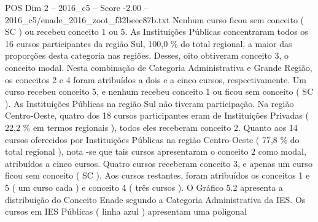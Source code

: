 \begin{textsample}{POS Dim 2 – 2016\_c5 – Score -2.00 – 2016\_c5/enade\_2016\_zoot\_f32beec87b.txt}
Nenhum curso ficou sem conceito ( SC ) ou recebeu conceito 1 ou 5.
As Instituições Públicas concentraram todos os 16 cursos participantes da região Sul, 100,0 \% do total regional, a maior das proporções desta categoria nas regiões.
Desses, oito obtiveram conceito 3, o conceito modal.
Nesta combinação de Categoria Administrativa e Grande Região, os conceitos 2 e 4 foram atribuídos a dois e a cinco cursos, respectivamente.
Um curso recebeu conceito 5, e nenhum recebeu conceito 1 ou ficou sem conceito ( SC ).
As Instituições Públicas na região Sul não tiveram participação.
Na região Centro-Oeste, quatro dos 18 cursos participantes eram de Instituições Privadas ( 22,2 \% em termos regionais ), todos eles receberam conceito 2.
Quanto aos 14 cursos oferecidos por Instituições Públicas na região Centro-Oeste ( 77,8 \% do total regional ), nota -se que tais cursos apresentaram o conceito 2 como modal, atribuídos a cinco cursos.
Quatro cursos receberam conceito 3, e apenas um curso ficou sem conceito ( SC ).
Aos cursos restantes, foram atribuídos os conceitos 1 e 5 ( um curso cada ) e conceito 4 ( três cursos ).
O Gráfico 5.2 apresenta a distribuição do Conceito Enade segundo a Categoria Administrativa da IES.
Os cursos em IES Públicas ( linha azul ) apresentam uma poligonal

\end{textsample}
